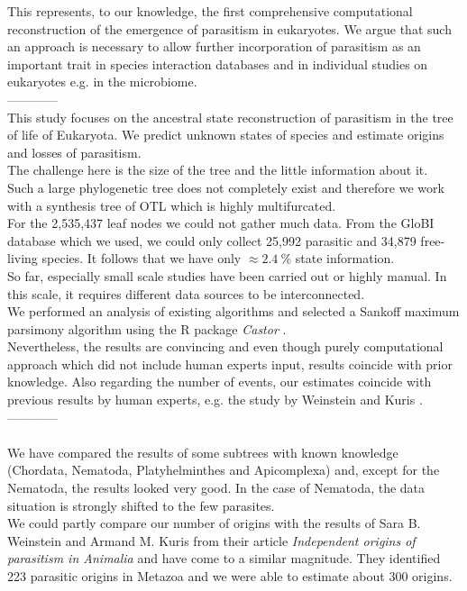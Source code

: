   This represents, to our knowledge, the first comprehensive computational reconstruction of the 
    emergence of parasitism in eukaryotes. We argue that such an approach is necessary to allow 
    further incorporation of parasitism as an important trait in species interaction databases and 
    in individual studies on eukaryotes e.g. in the microbiome. \\

  ------------ \\

  This study focuses on the ancestral state reconstruction of parasitism in the tree of life of
    Eukaryota. We predict unknown states of species and estimate origins and losses of parasitism. \\
  The challenge here is the size of the tree and the little information about it. \\
  Such a large phylogenetic tree does not completely exist and therefore we work with a synthesis 
    tree of OTL \cite{Hinchliff2015} which is highly multifurcated. \\
  For the 2,535,437 leaf nodes we could not gather much data. From the GloBI database 
    \cite{Poelen2014} which we used, we could only collect 25,992 parasitic and 34,879 
    free-living species. It follows that we have only $\approx 2.4~\%$ state information. \\
  So far, especially small scale studies have been carried out or highly manual. In this scale, it 
    requires different data sources to be interconnected. \\
  We performed an analysis of existing algorithms and selected a Sankoff maximum parsimony algorithm 
    using the R package \textit{Castor} \cite{Louca2017}. \\
  Nevertheless, the results are convincing and even though purely computational approach which did 
    not include human experts input, results coincide with prior knowledge. Also regarding the number 
    of events, our estimates coincide with previous results by human experts, e.g. the study by 
    Weinstein and Kuris \cite{Weinstein2016}. \\

  ------------ \\

   \\
  We have compared the results of some subtrees with known knowledge (Chordata, Nematoda, 
    Platyhelminthes and Apicomplexa) and, except for the Nematoda, the results looked very good. In 
    the case of Nematoda, the data situation is strongly shifted to the few parasites. \\
  We could partly compare our number of origins with the results of Sara B. Weinstein and Armand M. 
  Kuris from their article \textit{Independent origins of parasitism in Animalia}  
    and have come to a similar magnitude. They identified 223 parasitic origins in Metazoa and we 
    were able to estimate about 300 origins. \\

